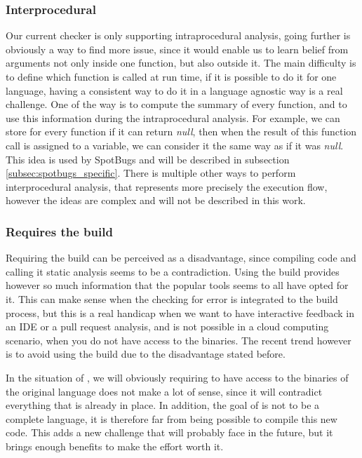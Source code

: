 \subsubsection{Interprocedural}
\label{subsubsec:inter_procedrual}

Our current checker is only supporting intraprocedural analysis, going further is obviously a way to find more issue, since it would enable us to learn belief from arguments not only inside one function, but also outside it.
The main difficulty is to define which function is called at run time, if it is possible to do it for one language, having a consistent way to do it in a language agnostic way is a real challenge. 
One of the way is to compute the summary of every function, and to use this information during the intraprocedural analysis. 
For example, we can store for every function if it can return \emph{null}, then when the result of this function call is assigned to a variable, we can consider it the same way as if it was \emph{null}. 
This idea is used by SpotBugs and will be described in subsection \ref{subsec:spotbugs_specific}. 
There is multiple other ways to perform interprocedural analysis, that represents more precisely the execution flow, however the ideas are complex and will not be described in this work.

\subsubsection{Requires the build}
\label{subsubsec:require_build}

Requiring the build can be perceived as a disadvantage, since compiling code and calling it static analysis seems to be a contradiction.
Using the build provides however so much information that the popular tools seems to all have opted for it.
This can make sense when the checking for error is integrated to the build process, but this is a real handicap when we want to have interactive feedback in an IDE or a pull request analysis, and is not possible in a cloud computing scenario, when you do not have access to the binaries. 
The recent trend however is to avoid using the build due to the disadvantage stated before.

In the situation of \slang{}, we will obviously requiring to have access to the binaries of the original language does not make a lot of sense, since it will contradict everything that is already in place.
In addition, the goal of \slang{} is not to be a complete language, it is therefore far from being possible to compile this new code. 
This adds a new challenge that \slang{} will probably face in the future, but it brings enough benefits to make the effort worth it.

